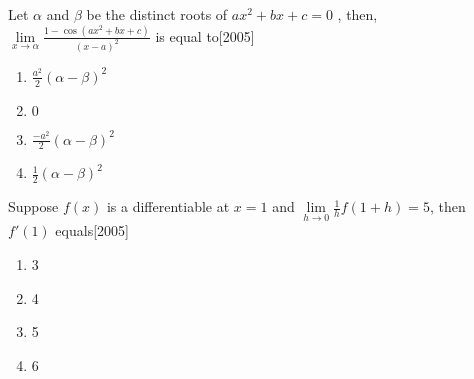 \item Let $\alpha$ and $\beta$ be the distinct roots of $ax^2+bx+c=0$ , then, $\displaystyle\lim\limits_{x\to\alpha}\frac{1-\cos(ax^2+bx+c)}{(x-a)^2}$ is equal to\hfill[2005]\\
\begin{enumerate}

    \item{$\frac{a^2}{2}(\alpha-\beta)^2$}
    \item{$0$}
    \item{$\frac{-a^2}{2}(\alpha-\beta)^2$}
    \item{$\frac{1}{2}(\alpha-\beta)^2$}\\[2pt]

\end{enumerate}
\item 	Suppose $f(x)$ is a differentiable at $x=1$ and $\displaystyle\lim\limits_{h\to 0}\frac{1}{h}f(1+h)=5$, then $f'(1)$ equals\hfill[2005]\\
\begin{enumerate}
    \item{3}
    \item{4}
    \item{5}
    \item{6}
\end{enumerate}
%

